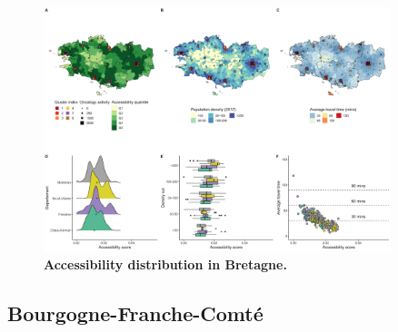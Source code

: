 \begin{figure}[H]
    \includegraphics[width=0.9\textwidth]{images/camion/region_accessibility/accessibility_Bretagne.png}
    \centering
    \caption{
        \textbf{Accessibility distribution in Bretagne.}
    }
\end{figure}

\subsection*{Bourgogne-Franche-Comté}

